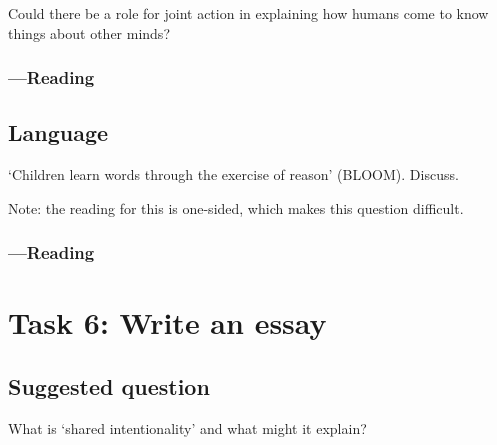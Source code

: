 \documentclass[12pt,\papersize]{extarticle}
\begin{document}
Could there be a role for joint action in explaining how humans come to know things about other minds?

\subsubsection{---Reading}







\subsection{Language}
‘Children learn words through the exercise of reason’ (BLOOM).  Discuss.

Note: the reading for this is one-sided, which makes this question difficult.


\subsubsection{---Reading}






\subsection{}






\clearpage
\section{Task 6: Write an essay}

\subsection{Suggested question}
What is ‘shared intentionality’ and what might it explain?    
\end{document}
